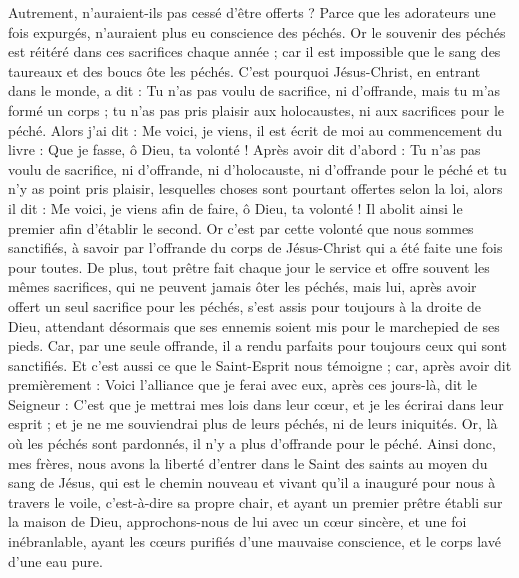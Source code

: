 \begin{multicols}{2}
Autrement, n'auraient-ils pas cessé d'être offerts ? Parce que les adorateurs une fois expurgés, n'auraient plus eu conscience des péchés.
Or le souvenir des péchés est réitéré dans ces sacrifices chaque année ;
car il est impossible que le sang des taureaux et des boucs ôte les péchés.
C'est pourquoi Jésus-Christ, en entrant dans le monde, a dit : Tu n'as pas voulu de sacrifice, ni d'offrande, mais tu m'as formé un corps ;
tu n'as pas pris plaisir aux holocaustes, ni aux sacrifices pour le péché.
Alors j'ai dit : Me voici, je viens, il est écrit de moi au commencement du livre : Que je fasse, ô Dieu, ta volonté !
Après avoir dit d'abord : Tu n'as pas voulu de sacrifice, ni d'offrande, ni d'holocauste, ni d'offrande pour le péché et tu n'y as point pris plaisir, lesquelles choses sont pourtant offertes selon la loi, alors il dit : Me voici, je viens afin de faire, ô Dieu, ta volonté !
Il abolit ainsi le premier afin d'établir le second.
Or c'est par cette volonté que nous sommes sanctifiés, à savoir par l'offrande du corps de Jésus-Christ qui a été faite une fois pour toutes.
De plus, tout prêtre fait chaque jour le service et offre souvent les mêmes sacrifices, qui ne peuvent jamais ôter les péchés,
mais lui, après avoir offert un seul sacrifice pour les péchés, s'est assis pour toujours à la droite de Dieu,
attendant désormais que ses ennemis soient mis pour le marchepied de ses pieds.
Car, par une seule offrande, il a rendu parfaits pour toujours ceux qui sont sanctifiés.
Et c'est aussi ce que le Saint-Esprit nous témoigne ; car, après avoir dit premièrement :
Voici l'alliance que je ferai avec eux, après ces jours-là, dit le Seigneur : C'est que je mettrai mes lois dans leur cœur, et je les écrirai dans leur esprit ;
et je ne me souviendrai plus de leurs péchés, ni de leurs iniquités.
Or, là où les péchés sont pardonnés, il n'y a plus d'offrande pour le péché.
Ainsi donc, mes frères, nous avons la liberté d'entrer dans le Saint des saints au moyen du sang de Jésus,
qui est le chemin nouveau et vivant qu'il a inauguré pour nous à travers le voile, c'est-à-dire sa propre chair,
et ayant un premier prêtre établi sur la maison de Dieu,
approchons-nous de lui avec un cœur sincère, et une foi inébranlable, ayant les cœurs purifiés d'une mauvaise conscience, et le corps lavé d'une eau pure.

\end{multicols}
